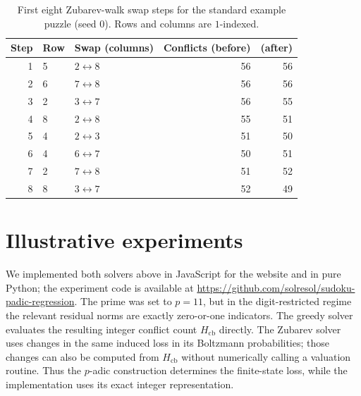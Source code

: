 \documentclass[11pt]{article}
\begin{document}
\begin{table}[t]
\centering
\begin{tabular}{@{}rllrr@{}}
\toprule
Step & Row & Swap (columns) & Conflicts (before) & (after) \\
\midrule
1 & 5 & $2\leftrightarrow 8$ & 56 & 56 \\
2 & 6 & $7\leftrightarrow 8$ & 56 & 56 \\
3 & 2 & $3\leftrightarrow 7$ & 56 & 55 \\
4 & 8 & $2\leftrightarrow 8$ & 55 & 51 \\
5 & 4 & $2\leftrightarrow 3$ & 51 & 50 \\
6 & 4 & $6\leftrightarrow 7$ & 50 & 51 \\
7 & 2 & $7\leftrightarrow 8$ & 51 & 52 \\
8 & 8 & $3\leftrightarrow 7$ & 52 & 49 \\
\bottomrule
\end{tabular}
\caption{First eight Zubarev-walk swap steps for the standard example puzzle (seed \(0\)). Rows and columns are \(1\)-indexed.}
\label{tab:trace-zubarev}
\end{table}

\section{Illustrative experiments}
\label{app:heuristics-results}
We implemented both solvers above in JavaScript for the website and in pure Python; the experiment code is available at \url{https://github.com/solresol/sudoku-padic-regression}. The prime was set to $p=11$, but in the digit-restricted regime the relevant residual norms are exactly zero-or-one indicators. The greedy solver evaluates the resulting integer conflict count \(H_{\mathrm{cb}}\) directly. The Zubarev solver uses changes in the same induced loss in its Boltzmann probabilities; those changes can also be computed from \(H_{\mathrm{cb}}\) without numerically calling a valuation routine. Thus the \(p\)-adic construction determines the finite-state loss, while the implementation uses its exact integer representation.
\end{document}
